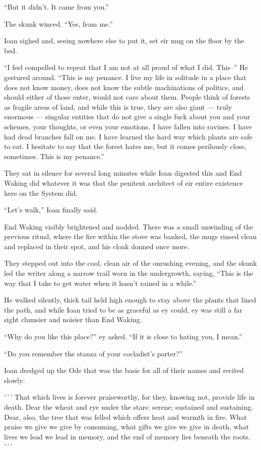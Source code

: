 ``But it didn't. It came from you.''

The skunk winced. ``Yes, from me.''

Ioan sighed and, seeing nowhere else to put it, set eir mug on the floor by the bed.

``I feel compelled to repeat that I am not at all proud of what I did. This--'' He gestured around. ``This is my penance. I live my life in solitude in a place that does not know money, does not know the subtle machinations of politics, and should either of those enter, would not care about them. People think of forests as fragile areas of land, and while this is true, they are also giant — truly enormous — singular entities that do not give a single fuck about you and your schemes, your thoughts, or even your emotions. I have fallen into ravines. I have had dead branches fall on me. I have learned the hard way which plants are safe to eat. I hesitate to say that the forest hates me, but it comes perilously close, sometimes. This is my penance.''

They sat in silence for several long minutes while Ioan digested this and End Waking did whatever it was that the penitent architect of eir entire existence here on the System did.

``Let's walk,'' Ioan finally said.

End Waking visibly brightened and nodded. There was a small unwinding of the previous ritual, where the fire within the stove was banked, the mugs rinsed clean and replaced in their spot, and his cloak donned once more.

They stepped out into the cool, clean air of the onrushing evening, and the skunk led the writer along a narrow trail worn in the undergrowth, saying, ``This is the way that I take to get water when it hasn't rained in a while.''

He walked silently, thick tail held high enough to stay above the plants that lined the path, and while Ioan tried to be as graceful as ey could, ey was still a far sight clumsier and noisier than End Waking.

``Why do you like this place?'' ey asked. ``If it is close to hating you, I mean.''

``Do you remember the stanza of your cocladist's parter?''

Ioan dredged up the Ode that was the basis for all of their names and recited slowly:

'\,'\,' That which lives is forever praiseworthy, for they, knowing not, provide life in death. Dear the wheat and rye under the stars: serene; sustained and sustaining. Dear, also, the tree that was felled which offers heat and warmth in fire. What praise we give we give by consuming, what gifts we give we give in death, what lives we lead we lead in memory, and the end of memory lies beneath the roots. '\,'\,'

